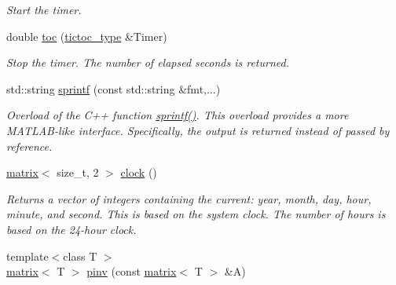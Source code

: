 \begin{DoxyCompactItemize}
\begin{DoxyCompactList}\small\item\em Start the timer. \end{DoxyCompactList}\item 
\hypertarget{namespacekeycpp_afe03fbbb5126729fb4b9367097acb1d1}{double \hyperlink{namespacekeycpp_afe03fbbb5126729fb4b9367097acb1d1}{toc} (\hyperlink{structkeycpp_1_1tictoc__type}{tictoc\-\_\-type} \&Timer)}\label{namespacekeycpp_afe03fbbb5126729fb4b9367097acb1d1}

\begin{DoxyCompactList}\small\item\em Stop the timer. The number of elapsed seconds is returned. \end{DoxyCompactList}\item 
\hypertarget{namespacekeycpp_a9d70a761d33bbc2bdec6b4e0eb43d517}{std\-::string \hyperlink{namespacekeycpp_a9d70a761d33bbc2bdec6b4e0eb43d517}{sprintf} (const std\-::string \&fmt,...)}\label{namespacekeycpp_a9d70a761d33bbc2bdec6b4e0eb43d517}

\begin{DoxyCompactList}\small\item\em Overload of the C++ function \hyperlink{namespacekeycpp_a9d70a761d33bbc2bdec6b4e0eb43d517}{sprintf()}. This overload provides a more M\-A\-T\-L\-A\-B-\/like interface. Specifically, the output is returned instead of passed by reference. \end{DoxyCompactList}\item 
\hypertarget{namespacekeycpp_aa002278cc556c656aab5b157e81017b6}{\hyperlink{classkeycpp_1_1matrix}{matrix}$<$ size\-\_\-t, 2 $>$ \hyperlink{namespacekeycpp_aa002278cc556c656aab5b157e81017b6}{clock} ()}\label{namespacekeycpp_aa002278cc556c656aab5b157e81017b6}

\begin{DoxyCompactList}\small\item\em Returns a vector of integers containing the current\-: year, month, day, hour, minute, and second. This is based on the system clock. The number of hours is based on the 24-\/hour clock. \end{DoxyCompactList}\item 
\hypertarget{namespacekeycpp_ac20bd2ef4fb18cbcdb0f462a89447bd7}{{\footnotesize template$<$class T $>$ }\\\hyperlink{classkeycpp_1_1matrix}{matrix}$<$ T $>$ \hyperlink{namespacekeycpp_ac20bd2ef4fb18cbcdb0f462a89447bd7}{pinv} (const \hyperlink{classkeycpp_1_1matrix}{matrix}$<$ T $>$ \&A)}\label{namespacekeycpp_ac20bd2ef4fb18cbcdb0f462a89447bd7}


\end{DoxyCompactItemize}
